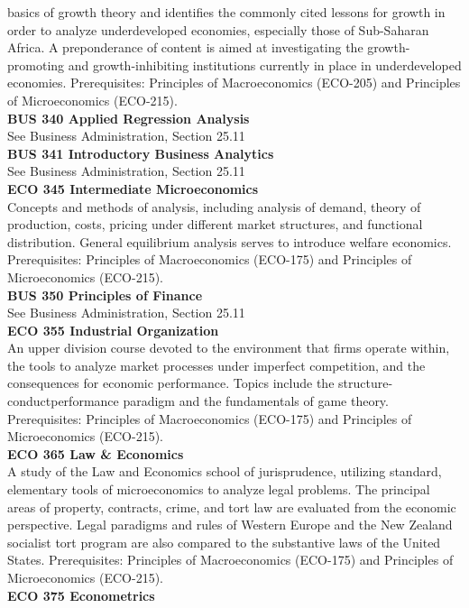 \documentclass[
  letterpaper,
]{scrbook}
\begin{document}
basics of growth theory and identifies the commonly cited lessons for
growth in order to analyze underdeveloped economies, especially those of
Sub-Saharan Africa. A preponderance of content is aimed at investigating
the growth-promoting and growth-inhibiting institutions currently in
place in underdeveloped economies. Prerequisites: Principles of
Macroeconomics (ECO-205) and Principles of Microeconomics (ECO-215).\\
\textbf{BUS 340 Applied Regression Analysis}\\
See Business Administration, Section 25.11\\
\textbf{BUS 341 Introductory Business Analytics}\\
See Business Administration, Section 25.11\\
\textbf{ECO 345 Intermediate Microeconomics}\\
Concepts and methods of analysis, including analysis of demand, theory
of production, costs, pricing under different market structures, and
functional distribution. General equilibrium analysis serves to
introduce welfare economics. Prerequisites: Principles of Macroeconomics
(ECO-175) and Principles of Microeconomics (ECO-215).\\
\textbf{BUS 350 Principles of Finance}\\
See Business Administration, Section 25.11\\
\textbf{ECO 355 Industrial Organization}\\
An upper division course devoted to the environment that firms operate
within, the tools to analyze market processes under imperfect
competition, and the consequences for economic performance. Topics
include the structure-conductperformance paradigm and the fundamentals
of game theory. Prerequisites: Principles of Macroeconomics (ECO-175)
and Principles of Microeconomics (ECO-215).\\
\textbf{ECO 365 Law \& Economics}\\
A study of the Law and Economics school of jurisprudence, utilizing
standard, elementary tools of microeconomics to analyze legal problems.
The principal areas of property, contracts, crime, and tort law are
evaluated from the economic perspective. Legal paradigms and rules of
Western Europe and the New Zealand socialist tort program are also
compared to the substantive laws of the United States. Prerequisites:
Principles of Macroeconomics (ECO-175) and Principles of Microeconomics
(ECO-215).\\
\textbf{ECO 375 Econometrics}\\
\end{document}
